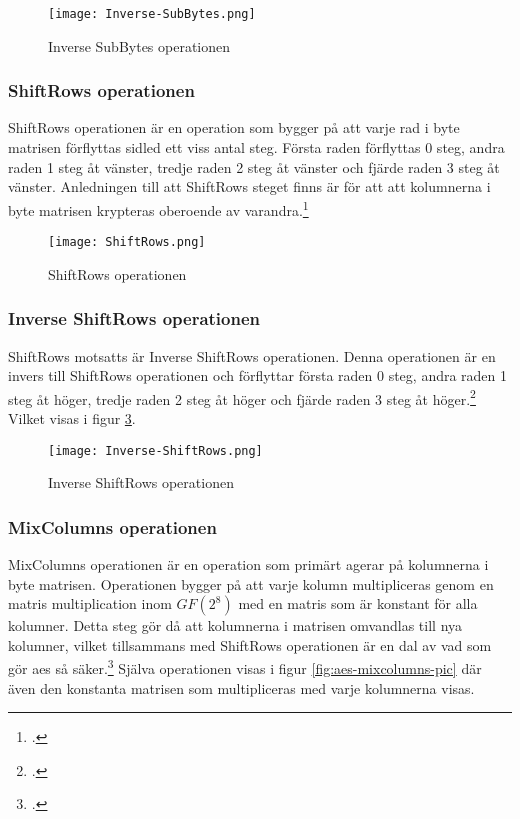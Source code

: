 \begin{figure}[H]
    \centering
    \texttt{[image: Inverse-SubBytes.png]}
    \caption{Inverse SubBytes operationen}
    \label{fig:aes-inverse-subbytes-pic}
\end{figure}

\subsubsection{ShiftRows operationen}
\label{sec:aes-shiftrows}

ShiftRows operationen är en operation som bygger på att varje rad i \gls{byte} matrisen förflyttas sidled ett viss antal steg.
Första raden förflyttas 0 steg, andra raden 1 steg åt vänster, tredje raden 2 steg åt vänster och fjärde raden 3 steg åt vänster. Anledningen till att ShiftRows steget
finns är för att att kolumnerna i \gls{byte} matrisen krypteras oberoende av varandra.\footcite{daemen1999aes}

\begin{figure}[H]
    \centering
    \texttt{[image: ShiftRows.png]}
    \caption{ShiftRows operationen}
    \label{fig:aes-shiftrows-pic}
\end{figure}

\subsubsection{Inverse ShiftRows operationen}
\label{sec:aes-invers-shiftrows}

ShiftRows motsatts är Inverse ShiftRows operationen. Denna operationen är en invers till ShiftRows operationen och förflyttar
första raden 0 steg, andra raden 1 steg åt höger, tredje raden 2 steg åt höger och fjärde raden 3 steg åt höger.\footcite{daemen1999aes}
Vilket visas i figur \ref{fig:aes-inverse-shiftrows-pic}.

\begin{figure}[H]
    \centering
    \texttt{[image: Inverse-ShiftRows.png]}
    \caption{Inverse ShiftRows operationen}
    \label{fig:aes-inverse-shiftrows-pic}
\end{figure}

\subsubsection{MixColumns operationen} %
\label{sec:aes-mixcolumns}

MixColumns operationen är en operation som primärt agerar på kolumnerna i \gls{byte} matrisen. Operationen bygger på att varje kolumn multipliceras genom en
matris multiplication inom \hyperref[sec:finite-fields]{$GF(2^8)$} med en matris som är konstant för alla kolumner. Detta steg gör då att kolumnerna i matrisen omvandlas till nya kolumner,
vilket tillsammans med ShiftRows operationen är en dal av vad som gör \acrshort{aes} så säker.\footcite{daemen1999aes} Själva operationen visas i figur \ref{fig:aes-mixcolumns-pic}
där även den konstanta matrisen som multipliceras med varje kolumnerna visas.

